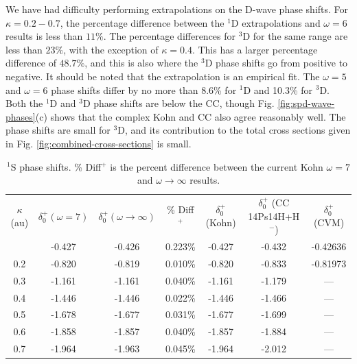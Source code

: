 \documentclass[reprint,showpacs,preprintnumbers,amsmath,amssymb,pra,aps]{revtex4-1}
\begin{document}
We have had difficulty performing extrapolations on the D-wave phase shifts. For $\kappa = 0.2 - 0.7$, the percentage difference between the $^1$D extrapolations and $\omega = 6$ results is less than $11\%$. The percentage differences for $^3$D for the same range are less than $23\%$, with the exception of $\kappa = 0.4$. This has a larger percentage difference of $48.7\%$, and this is also where the $^3$D phase shifts go from positive to negative. It should be noted that the extrapolation is an empirical fit. The $\omega = 5$ and $\omega = 6$ phase shifts differ by no more than 8.6\% for $^1$D and 10.3\% for $^3$D. Both the $^1$D and $^3$D phase shifts are below the CC, though Fig. \ref{fig:spd-wave-phases}(c) shows that the complex Kohn and CC also agree reasonably well. The phase shifts are small for $^3$D, and its contribution to the total cross sections given in Fig. \ref{fig:combined-cross-sections} is small.


\begin{table}
\centering
\begin{ruledtabular}
\begin{tabular}{c c c c c c c}
$\kappa$ (au) & $\delta_0^+ (\omega = 7)$ & $\delta_0^+ (\omega \rightarrow \infty)$ & \% Diff$^+$ & $\delta_0^+$ (Kohn) \cite{VanReeth2003} & $\delta_0^+$ (CC 14Ps14H+H$^-$) \cite{Walters2004} & $\delta_0^+$ (CVM) \cite{Zhang2012} \\
\colrule
0.1 & -0.427 & -0.426 & 0.223\% & -0.427 & -0.432 & -0.42636 \\
0.2 & -0.820 & -0.819 & 0.010\% & -0.820 & -0.833 & -0.81973 \\
0.3 & -1.161 & -1.161 & 0.040\% & -1.161 & -1.179 & --- \\
0.4 & -1.446 & -1.446 & 0.022\% & -1.446 & -1.466 & --- \\
0.5 & -1.678 & -1.677 & 0.031\% & -1.677 & -1.699 & --- \\
0.6 & -1.858 & -1.857 & 0.040\% & -1.857 & -1.884 & --- \\
0.7 & -1.964 & -1.963 & 0.045\% & -1.964 & -2.012 & --- \\
\end{tabular}
\end{ruledtabular}
\caption{$^1$S phase shifts. \% Diff$^+$ is the percent difference between the current Kohn $\omega = 7$ and $\omega \rightarrow \infty$ results.}
\label{tab:SWaveSingletPhase}
\end{table}
\end{document}
